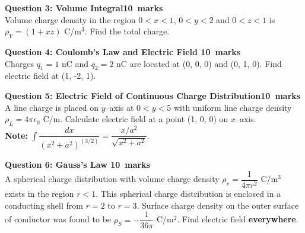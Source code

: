 \documentclass[12pt,a4paper]{article}
\def\Qthree{10}
\def\Qfour{10}
\def\Qfive{10}
\def\Qsix{10}
\begin{document}
\noindent \textbf{Question 3: Volume Integral\hfill \Qthree~marks}\\
Volume charge density in the region $0<x<1$, $0<y<2$ and $0<z<1$ is $\rho_V=(1+xz)$ C/m$^3$. Find the total charge.
\begin{figure}[H]
\end{figure}

\noindent\textbf{Question 4: Coulomb's Law and Electric Field \hfill \Qfour~marks}\\
Charges $q_1=1$ nC and $q_2=2$ nC are located at (0, 0, 0) and (0, 1, 0). Find electric field at (1, -2, 1).
\begin{figure}[H]
\end{figure}

\noindent\textbf{Question 5: Electric Field of Continuous Charge Distribution\hfill \Qfive~marks}\\
A line charge is placed on $y$--axis at $0<y<5$ with uniform line charge density $\rho_L=4\pi\epsilon_0$ C/m. Calculate electric field at a point (1, 0, 0) on $x$--axis.\\
\textbf{Note:} $\int\dfrac{dx}{(x^2+a^2)^{(3/2)}}=\dfrac{x/a^2}{\sqrt{x^2+a^2}}$.
\begin{figure}[H]
\end{figure}

\noindent\textbf{Question 6: Gauss's Law \hfill \Qsix~marks}\\
A spherical charge distribution with volume charge density $\rho_v=\dfrac{1}{4\pi r^2}$ C/m$^3$ exists in the region $r<1$. This spherical charge distribution is enclosed in a conducting shell from $r=2$ to $r=3$. Surface charge density on the outer surface of conductor was found to be $\rho_S=-\dfrac{1}{36\pi}$ C/m$^2$. Find electric field \textbf{everywhere}.
\begin{figure}[H]
\end{figure}
\end{document}
